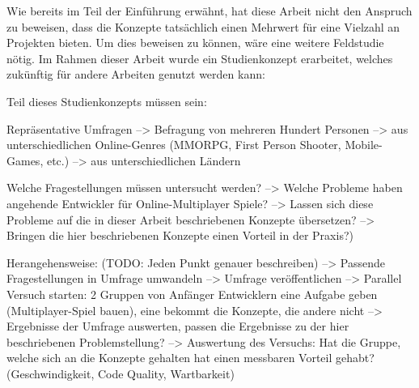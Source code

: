 Wie bereits im Teil der Einführung erwähnt, hat diese Arbeit nicht den Anspruch zu beweisen, dass die Konzepte tatsächlich einen Mehrwert für eine Vielzahl an Projekten bieten. Um dies beweisen zu können, wäre eine weitere Feldstudie nötig. Im Rahmen dieser Arbeit wurde ein Studienkonzept erarbeitet, welches zukünftig für andere Arbeiten genutzt werden kann:

Teil dieses Studienkonzepts müssen sein:

Repräsentative Umfragen
	--> Befragung von mehreren Hundert Personen
	--> aus unterschiedlichen Online-Genres (MMORPG, First Person Shooter, Mobile-Games, etc.)
	--> aus unterschiedlichen Ländern
	
Welche Fragestellungen müssen untersucht werden?
	--> Welche Probleme haben angehende Entwickler für Online-Multiplayer Spiele?
	--> Lassen sich diese Probleme auf die in dieser Arbeit beschriebenen Konzepte übersetzen?
	--> Bringen die hier beschriebenen Konzepte einen Vorteil in der Praxis?)

Herangehensweise: (TODO: Jeden Punkt genauer beschreiben)
	--> Passende Fragestellungen in Umfrage umwandeln
	--> Umfrage veröffentlichen
	--> Parallel Versuch starten: 2 Gruppen von Anfänger Entwicklern eine Aufgabe geben (Multiplayer-Spiel bauen), eine bekommt die Konzepte, die andere nicht
	--> Ergebnisse der Umfrage auswerten, passen die Ergebnisse zu der hier beschriebenen Problemstellung?
	--> Auswertung des Versuchs: Hat die Gruppe, welche sich an die Konzepte gehalten hat einen messbaren Vorteil gehabt? (Geschwindigkeit, Code Quality, Wartbarkeit)










